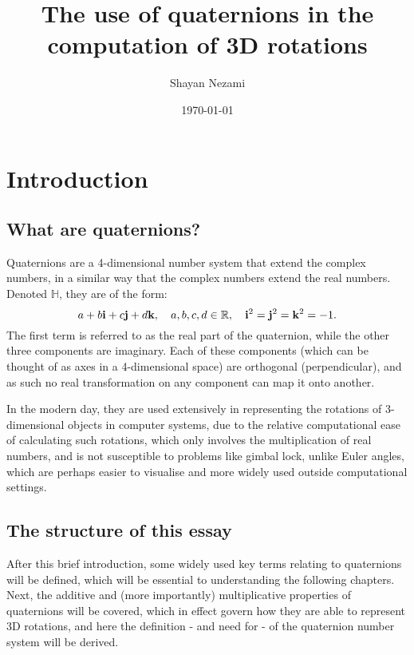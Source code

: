 \documentclass[10pt]{article}
\title{The use of quaternions in the computation of 3D rotations}
\author{Shayan Nezami}
\date{\today}
\begin{document}
\maketitle	
\pagebreak
\tableofcontents
\pagebreak

\section{Introduction}

\subsection{What are quaternions?}

Quaternions are a 4-dimensional number system that extend the complex numbers, in a similar way that the complex numbers extend the real numbers. Denoted $\mathbb{H}$, they are of the form:
\begin{equation}
    a + b\vb{i} + c\vb{j} + d\vb{k}, \quad a, b, c, d \in \mathbb{R}, \quad \vb{i}^2=\vb{j}^2=\vb{k}^2=-1.
\end{equation}
The first term is referred to as the real part of the quaternion, while the other three components are imaginary. Each of these components (which can be thought of as axes in a 4-dimensional space) are orthogonal (perpendicular), and as such no real transformation on any component can map it onto another.

In the modern day, they are used extensively in representing the rotations of 3-dimensional objects in computer systems, due to the relative computational ease of calculating such rotations, which only involves the multiplication of real numbers, and is not susceptible to problems like gimbal lock, unlike Euler angles, which are perhaps easier to visualise and more widely used outside computational settings. \cite{QuaternionWiki}

\subsection{The structure of this essay}

After this brief introduction, some widely used key terms relating to quaternions will be defined, which will be essential to understanding the following chapters. Next, the additive and (more importantly) multiplicative properties of quaternions will be covered, which in effect govern how they are able to represent 3D rotations, and here the definition - and need for - of the quaternion number system will be derived.
\end{document}
